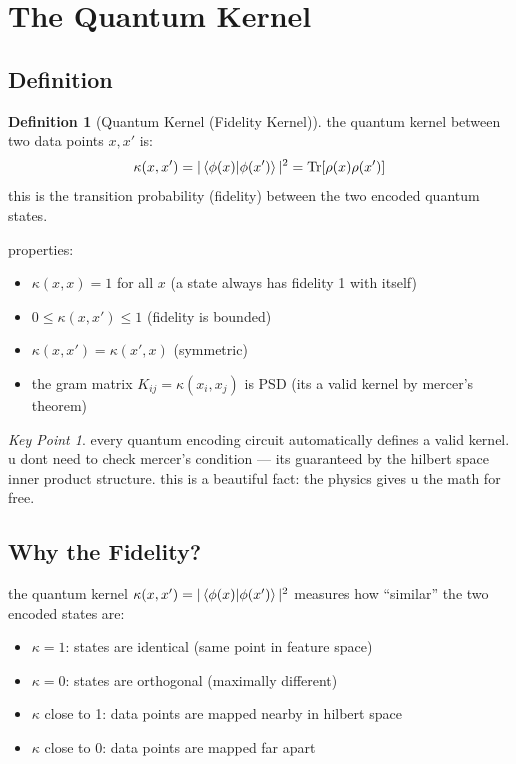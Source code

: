 \documentclass[11pt,a4paper]{article}
\theoremstyle{definition}
\newtheorem{definition}{Definition}[section]
\theoremstyle{remark}
\newtheorem*{keypoint}{Key Point}
\begin{document}
\section{The Quantum Kernel}

\subsection{Definition}

\begin{definition}[Quantum Kernel (Fidelity Kernel)]
the quantum kernel between two data points $x, x'$ is:
\[
\kappa(x, x') = |\braket{\phi(x)|\phi(x')}|^2 = \text{Tr}[\rho(x)\rho(x')]
\]
this is the transition probability (fidelity) between the two encoded quantum states.
\end{definition}

properties:
\begin{itemize}
    \item $\kappa(x, x) = 1$ for all $x$ (a state always has fidelity 1 with itself)
    \item $0 \leq \kappa(x, x') \leq 1$ (fidelity is bounded)
    \item $\kappa(x, x') = \kappa(x', x)$ (symmetric)
    \item the gram matrix $K_{ij} = \kappa(x_i, x_j)$ is PSD (its a valid kernel by mercer's theorem)
\end{itemize}

\begin{keypoint}
every quantum encoding circuit automatically defines a valid kernel. u dont need to check mercer's condition --- its guaranteed by the hilbert space inner product structure. this is a beautiful fact: the physics gives u the math for free.
\end{keypoint}

\subsection{Why the Fidelity?}

the quantum kernel $\kappa(x,x') = |\braket{\phi(x)|\phi(x')}|^2$ measures how ``similar'' the two encoded states are:
\begin{itemize}
    \item $\kappa = 1$: states are identical (same point in feature space)
    \item $\kappa = 0$: states are orthogonal (maximally different)
    \item $\kappa$ close to 1: data points are mapped nearby in hilbert space
    \item $\kappa$ close to 0: data points are mapped far apart
\end{itemize}
\end{document}
